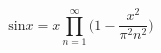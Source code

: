     \begin{center}
        \begin{equation*}
            \text{sin}x = x \prod^{\infty}_{n=1} \bigg(1 - \frac{x^2}{\pi^{2} n^{2}} \bigg)
        \end{equation*}
    \end{center}
